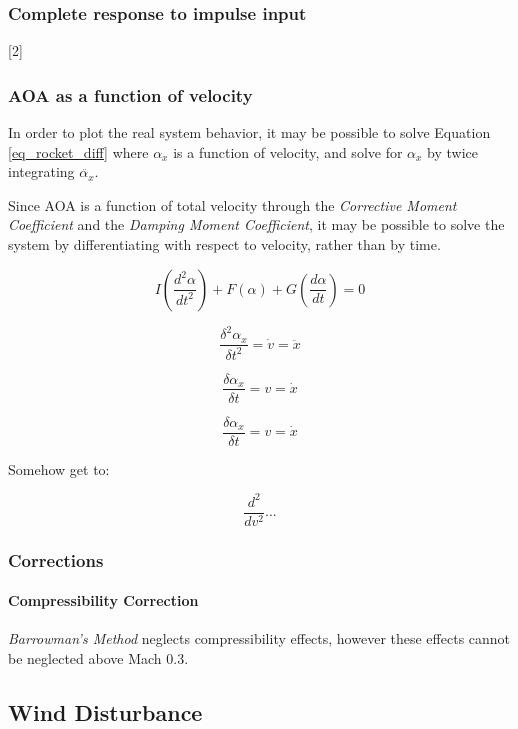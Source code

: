 \documentclass[]{article}
\let\oldparagraph\paragraph
\renewcommand{\paragraph}[1]{\oldparagraph{#1}\mbox{}}
\begin{document}
\subsubsection{Complete response to impulse
input}\label{complete-response-to-impulse-input-1}

{[}2{]}

\subsubsection{AOA as a function of
velocity}\label{aoa-as-a-function-of-velocity}

In order to plot the real system behavior, it may be possible to solve
Equation \ref{eq_rocket_diff} where \(\alpha_x\) is a function of
velocity, and solve for \(\alpha_x\) by twice integrating
\(\ddot{\alpha_x}\).

Since AOA is a function of total velocity through the \emph{Corrective
Moment Coefficient} and the \emph{Damping Moment Coefficient}, it may be
possible to solve the system by differentiating with respect to
velocity, rather than by time.

\[
I \left( \dfrac{d^2\alpha}{dt^2} \right) + F(\alpha) + G \left(\dfrac{d\alpha}{dt} \right) = 0
\]

\[
\dfrac{\delta^2 \alpha_x}{\delta t^2} = \dot{v} = \ddot{x}
\]

\[
\dfrac{\delta \alpha_x}{\delta t} = v = \dot{x}
\]

\[
\dfrac{\delta \alpha_x}{\delta t} = v = \dot{x}
\]

Somehow get to:

\[
\dfrac{d^2}{dv^2} ...
\]

\subsubsection{Corrections}\label{corrections}

\paragraph{Compressibility Correction}\label{compressibility-correction}

\emph{Barrowman's Method} neglects compressibility effects, however
these effects cannot be neglected above Mach 0.3.

\subsection{Wind Disturbance}\label{wind-disturbance}
\end{document}

